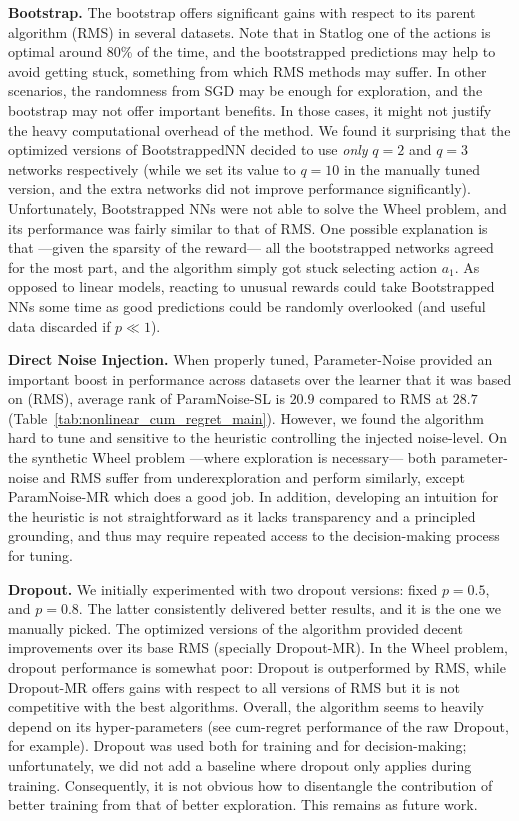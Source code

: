 \documentclass{article} \usepackage{iclr2018_conference,times}
\begin{document}
\textbf{Bootstrap.}
The bootstrap offers significant gains with respect to its parent algorithm (RMS) in several datasets.
Note that in Statlog one of the actions is optimal around 80\% of the time, and the bootstrapped predictions may help to avoid getting stuck, something from which RMS methods may suffer.
In other scenarios, the randomness from SGD may be enough for exploration, and the bootstrap may not offer important benefits.
In those cases, it might not justify the heavy computational overhead of the method.
We found it surprising that the optimized versions of BootstrappedNN decided to use \emph{only} $q=2$ and $q=3$ networks respectively (while we set its value to $q=10$ in the manually tuned version, and the extra networks did not improve performance significantly).
Unfortunately, Bootstrapped NNs were not able to solve the Wheel problem, and its performance was fairly similar to that of RMS.
One possible explanation is that ---given the sparsity of the reward--- all the bootstrapped networks agreed for the most part, and the algorithm simply got stuck selecting action $a_1$. As opposed to linear models, reacting to unusual rewards could take Bootstrapped NNs some time as good predictions could be randomly overlooked (and useful data discarded if $p \ll 1$).

\textbf{Direct Noise Injection.} When properly tuned, Parameter-Noise provided an important boost in performance across datasets over the learner that it was based on (RMS), average rank of ParamNoise-SL is $20.9$ compared to RMS at $28.7$ (Table~\ref{tab:nonlinear_cum_regret_main}). However, we found the algorithm hard to tune and sensitive to the heuristic controlling the injected noise-level. On the synthetic Wheel problem ---where exploration is necessary--- both parameter-noise and RMS suffer from underexploration and perform similarly, except ParamNoise-MR which does a good job. In addition, developing an intuition for the heuristic is not straightforward as it lacks transparency and a principled grounding, and thus may require repeated access to the decision-making process for tuning.

\textbf{Dropout.} We initially experimented with two dropout versions: fixed $p = 0.5$, and $p = 0.8$. The latter consistently delivered better results, and it is the one we manually picked.
The optimized versions of the algorithm provided decent improvements over its base RMS (specially Dropout-MR).
In the Wheel problem, dropout performance is somewhat poor: Dropout is outperformed by RMS, while Dropout-MR offers gains with respect to all versions of RMS but it is not competitive with the best algorithms.
Overall, the algorithm seems to heavily depend on its hyper-parameters (see cum-regret performance of the raw Dropout, for example).
Dropout was used both for training and for decision-making; unfortunately, we did not add a baseline where dropout only applies during training. Consequently, it is not obvious how to disentangle the contribution of better training from that of better exploration. This remains as future work.
\end{document}
